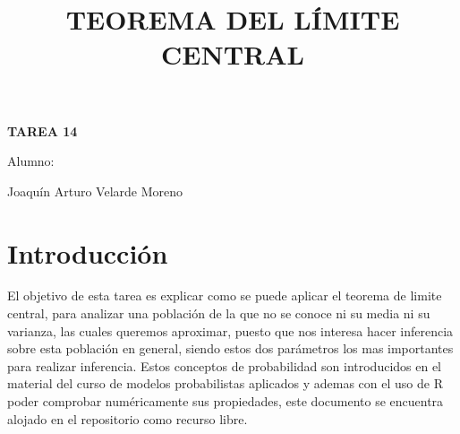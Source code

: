 \documentclass[]{article}
\title{TEOREMA DEL LÍMITE CENTRAL}
\date{}
\begin{document}
	\maketitle
	\begin{center}


\centerline{\textbf{TAREA 14} } 
\textbf{ }

\centerline{Alumno: } 
\centerline{Joaquín Arturo Velarde Moreno}


	\end{center}
	

\section{Introducción}

El objetivo de esta tarea es explicar como se puede aplicar el teorema de limite central, para analizar una población de la que no se conoce ni su media ni su varianza, las cuales queremos aproximar, puesto que nos interesa hacer inferencia sobre esta población en general, siendo estos dos parámetros los mas importantes para realizar inferencia. Estos conceptos de probabilidad son introducidos en el material del curso de modelos probabilistas aplicados\cite{MaterialClase} y ademas con el uso de R poder comprobar numéricamente sus propiedades\cite{rproject}, este documento se encuentra alojado en el repositorio\cite{repositorio} como recurso libre.
\end{document}
